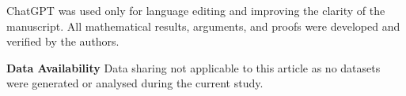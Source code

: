 \documentclass[11pt, twoside]{article}
\def\C{\mathcal{C}}
\numberwithin{equation}{section}
\begin{document}





\vspace{5mm}

\hspace{-5.5mm}{\bf Statement on AI}\hspace{2mm} ChatGPT was used only for language editing and improving the clarity of the manuscript. All mathematical results, arguments, and proofs were developed and verified by the authors.
\vspace{3mm}

\hspace{-5.5mm}\textbf{Data Availability}\hspace{2mm} Data sharing not applicable to this article as no datasets were generated or analysed during
the current study.
\vspace{3mm}
\end{document}
